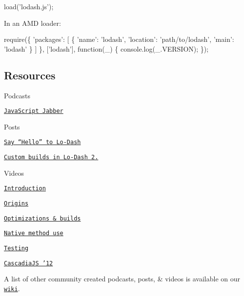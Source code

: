 \begin{DoxyCode}
load('lodash.js');
\end{DoxyCode}


In an A\+MD loader\+:


\begin{DoxyCode}
require(\{
  'packages': [
    \{ 'name': 'lodash', 'location': 'path/to/lodash', 'main': 'lodash' \}
  ]
\},
['lodash'], function(\_) \{
  console.log(\_.VERSION);
\});
\end{DoxyCode}


\subsection*{Resources}


\begin{DoxyItemize}
\item Podcasts
\begin{DoxyItemize}
\item \href{http://javascriptjabber.com/079-jsj-lo-dash-with-john-david-dalton/}{\tt Java\+Script Jabber}
\end{DoxyItemize}
\item Posts
\begin{DoxyItemize}
\item \href{http://kitcambridge.be/blog/say-hello-to-lo-dash/}{\tt Say “\+Hello” to Lo-\/\+Dash}
\item \href{http://kitcambridge.be/blog/custom-builds-in-lo-dash-2-dot-0/}{\tt Custom builds in Lo-\/\+Dash 2.}
\end{DoxyItemize}
\item Videos
\begin{DoxyItemize}
\item \href{https://vimeo.com/44154599}{\tt Introduction}
\item \href{https://vimeo.com/44154600}{\tt Origins}
\item \href{https://vimeo.com/44154601}{\tt Optimizations \& builds}
\item \href{https://vimeo.com/48576012}{\tt Native method use}
\item \href{https://vimeo.com/45865290}{\tt Testing}
\item \href{http://www.youtube.com/watch?v=dpPy4f_SeEk}{\tt Cascadia\+JS ’12}
\end{DoxyItemize}
\end{DoxyItemize}

A list of other community created podcasts, posts, \& videos is available on our \href{https://github.com/lodash/lodash/wiki/Resources}{\tt wiki}.

